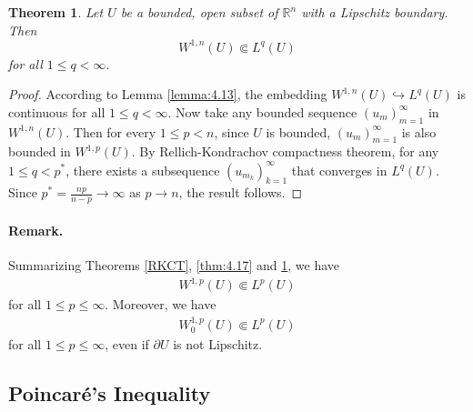 \documentclass{article}
\numberwithin{equation}{section}
\newcommand{\bbR}{\mathbb{R}}
\theoremstyle{plain}
\newtheorem{theorem}{Theorem}[section]
\theoremstyle{definition}
\begin{document}
\begin{theorem}\label{thm:4.18}
Let $U$ be a bounded, open subset of $\bbR^n$ with a Lipschitz boundary. Then $$W^{1,n}(U)\Subset L^q(U)$$ for all $1\leq q<\infty$.
\end{theorem}
\begin{proof}
According to Lemma \ref{lemma:4.13}, the embedding $W^{1,n}(U)\hookrightarrow L^q(U)$ is continuous for all $1\leq q<\infty$. Now take any bounded sequence $(u_m)_{m=1}^\infty$  in $W^{1,n}(U)$. Then for every $1\leq p<n$, since $U$ is bounded, $(u_m)_{m=1}^\infty$ is also bounded in $W^{1,p}(U)$. By Rellich-Kondrachov compactness theorem, for any $1\leq q<p^*$, there exists a subsequence $(u_{m_k})_{k=1}^\infty$ that converges in $L^q(U)$. Since $p^*=\frac{np}{n-p}\to\infty$ as $p\to n$, the result follows.
\end{proof}

\paragraph{Remark.} Summarizing Theorems \ref{RKCT}, \ref{thm:4.17} and \ref{thm:4.18}, we have
\begin{align*}
	W^{1,p}(U)\Subset L^p(U)
\end{align*}
for all $1\leq p\leq\infty$. Moreover, we have
\begin{align*}
	W^{1,p}_0(U)\Subset L^p(U)
\end{align*}
for all $1\leq p\leq\infty$, even if $\partial U$ is not Lipschitz.

\newpage
\subsection{Poincaré’s Inequality}
\end{document}
